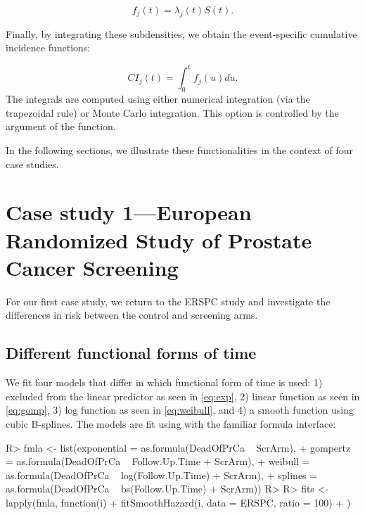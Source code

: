 \documentclass[
]{jss}
\begin{document}
\[ f_j(t) = \lambda_j(t)S(t).\]

Finally, by integrating these subdensities, we obtain the event-specific
cumulative incidence functions:

\[ CI_j(t) = \int_0^t f_j(u)du.\] The integrals are computed using
either numerical integration (via the trapezoidal rule) or Monte Carlo
integration. This option is controlled by the argument  of
the  function.

In the following sections, we illustrate these functionalities in the
context of four case studies.

\hypertarget{case-study-1european-randomized-study-of-prostate-cancer-screening}{%
\section{Case study 1---European Randomized Study of Prostate Cancer
Screening}\label{case-study-1european-randomized-study-of-prostate-cancer-screening}}

For our first case study, we return to the ERSPC study and investigate
the differences in risk between the control and screening arms.

\subsection{Different functional forms of time}

We fit four models that differ in which functional form of time is used:
1) excluded from the linear predictor as seen in \eqref{eq:exp}, 2)
linear function as seen in \eqref{eq:gomp}, 3) log function as seen in
\eqref{eq:weibull}, and 4) a smooth function using cubic B-splines. The
models are fit using  with the familiar formula
interface:

\begin{CodeChunk}

\begin{CodeInput}
R> fmla <- list(exponential = as.formula(DeadOfPrCa ~ ScrArm),
+              gompertz = as.formula(DeadOfPrCa ~ Follow.Up.Time + ScrArm),
+              weibull = as.formula(DeadOfPrCa ~ log(Follow.Up.Time) + ScrArm),
+              splines = as.formula(DeadOfPrCa ~ bs(Follow.Up.Time) + ScrArm))
R> 
R> fits <- lapply(fmla, function(i) {
+   fitSmoothHazard(i, data = ERSPC, ratio = 100)
+ })
\end{CodeInput}
\end{CodeChunk}
\end{document}
